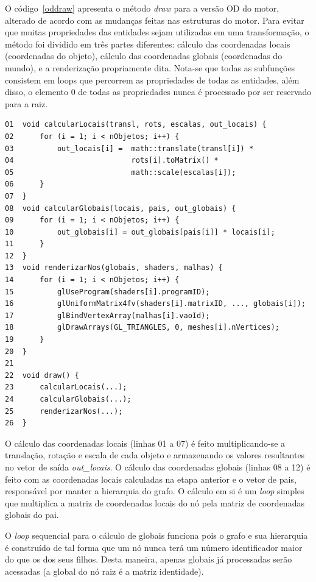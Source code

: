 O código~\ref{oddraw} apresenta o método \textit{draw} para a 
versão OD do motor, alterado de acordo com as mudanças feitas nas 
estruturas do motor. Para evitar que muitas propriedades das 
entidades sejam utilizadas em uma transformação, o método foi 
dividido em três partes diferentes: cálculo das coordenadas locais 
(coordenadas do objeto), cálculo das coordenadas globais (coordenadas 
do mundo), e a renderização propriamente dita. Nota-se que todas 
as subfunções consistem em loops que percorrem as propriedades de 
todas as entidades, além disso, o elemento 0 de todas as 
propriedades nunca é processado por ser reservado para a raiz.

\begin{lstlisting}[frame=single, caption={Método draw versão OD}, label=oddraw]
01  void calcularLocais(transl, rots, escalas, out_locais) {
02      for (i = 1; i < nObjetos; i++) {
03          out_locais[i] =  math::translate(transl[i]) *
04                           rots[i].toMatrix() *
05                           math::scale(escalas[i]);
06      }
07  }
08  void calcularGlobais(locais, pais, out_globais) {
09      for (i = 1; i < nObjetos; i++) {
10          out_globais[i] = out_globais[pais[i]] * locais[i];
11      }
12  }
13  void renderizarNos(globais, shaders, malhas) {
14      for (i = 1; i < nObjetos; i++) {
15          glUseProgram(shaders[i].programID);
16          glUniformMatrix4fv(shaders[i].matrixID, ..., globais[i]);
17          glBindVertexArray(malhas[i].vaoId);
18          glDrawArrays(GL_TRIANGLES, 0, meshes[i].nVertices);
19      }
20  }
21
22  void draw() {
23      calcularLocais(...);
24      calcularGlobais(...);
25      renderizarNos(...);
26  }
\end{lstlisting}

O cálculo das coordenadas locais (linhas 01 a 07) é feito 
multiplicando-se a translação, rotação e escala de cada objeto e 
armazenando os valores resultantes no vetor de saída 
\textit{out\_locais}. O cálculo das coordenadas globais (linhas 08 a 
12) é feito com as coordenadas locais calculadas na etapa anterior 
e o vetor de pais, responsável por manter a hierarquia do grafo. O 
cálculo em si é um \textit{loop} simples que multiplica a matriz de 
coordenadas locais do nó pela matriz de coordenadas globais do pai. 

O \textit{loop} sequencial para o cálculo de globais funciona pois 
o grafo e sua hierarquia é construído de tal forma que um nó nunca 
terá um número identificador maior do que os dos seus filhos. Desta 
maneira, apenas globais já processadas serão acessadas (a global 
do nó raiz é a matriz identidade).

